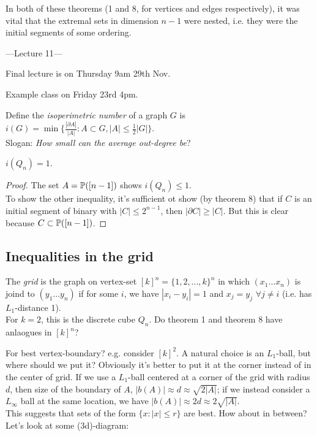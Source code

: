 \documentclass[a4paper]{article}
\begin{document}
\begin{rem}
    In both of these theorems (1 and 8, for vertices and edges respectively), it was vital that the extremal sets in dimension $n-1$ were nested, i.e. they were the initial segments of some ordering.
\end{rem}

---Lecture 11---

Final lecture is on Thursday 9am 29th Nov.

Example class on Friday 23rd 4pm.

Define the \emph{isoperimetric number} of a graph $G$ is $i(G) = \min\{\frac{|\partial A|}{|A|}: A \subset G, |A| \leq \frac{1}{2}|G|\}$.\\
Slogan: \emph{How small can the average out-degree be}?

\begin{coro}
    $i(Q_n) = 1$.
    \begin{proof}
        The set $A = \P([n-1])$ shows $i(Q_n) \leq 1$.\\
        To show the other inequality, it's sufficient ot show (by theorem 8) that if $C$ is an initial segment of binary with $|C| \leq 2^{n-1}$, then $|\partial C| \geq |C|$.
            But this is clear because $C \subset \P([n-1])$.
    \end{proof}
\end{coro}

\subsection{Inequalities in the grid}

The \emph{grid} is the graph on vertex-set $[k]^n = \{1,2,...,k\}^n$ in which $(x_1...x_n)$ is joind to $(y_1...y_n)$ if for some $i$, we have $|x_i - y_i| = 1$ and $x_j = y_j$ $\forall j \neq i$ (i.e. has $L_1$-distance 1).\\
For $k=2$, this is the discrete cube $Q_n$. Do theorem 1 and theorem 8 have anlaogues in $[k]^n$?

For best vertex-boundary? e.g. consider $[k]^2$. A natural choice is an $L_1$-ball, but where should we put it? Obviously it's better to put it at the corner instead of in the center of grid. If we use a $L_1$-ball centered at a corner of the grid with radius $d$, then size of the boundary of $A$, $|b(A)| \approx d \approx \sqrt{2|A|}$; if we instead consider a $L_\infty$ ball at the same location, we have $|b(A)| \approx 2d \approx 2\sqrt{|A|}$.\\
This suggests that sets of the form $\{x: |x| \leq r\}$ are best. How about in between? Let's look at some (3d)-diagram:
\end{document}

